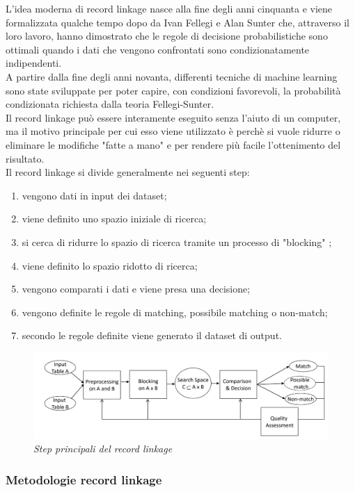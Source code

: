 \documentclass[a4paper,12pt]{article}
\begin{document}
\noindent L'idea moderna di record linkage nasce alla fine degli anni cinquanta e viene formalizzata qualche tempo dopo da Ivan Fellegi e Alan Sunter \cite{fellegi69} che, attraverso il loro lavoro, hanno dimostrato che le regole di decisione probabilistiche sono ottimali quando i dati che vengono confrontati sono condizionatamente indipendenti. \\
\noindent A partire dalla fine degli anni novanta, differenti tecniche di machine learning sono state sviluppate per poter capire, con condizioni favorevoli, la probabilità condizionata richiesta dalla teoria Fellegi-Sunter. \\
\noindent Il record linkage può essere interamente eseguito senza l'aiuto di un computer, ma il motivo principale per cui esso viene utilizzato è perchè si vuole ridurre o eliminare le modifiche "fatte a mano" e per rendere più facile l'ottenimento del risultato. \\
\newpage
\noindent Il record linkage si divide generalmente nei seguenti step:
\begin{enumerate}
\item vengono dati in input dei dataset;
\item viene definito uno spazio iniziale di ricerca;
\item si cerca di ridurre lo spazio di ricerca tramite un processo di "blocking" ;
\item viene definito lo spazio ridotto di ricerca;
\item vengono comparati i dati e viene presa una decisione;
\item vengono definite le regole di matching, possibile matching o non-match;
\item secondo le regole definite viene generato il dataset di output.
\end{enumerate}

\begin{figure}[H]
	\centering
	\includegraphics[width=0.8\linewidth]{img/recordlinkage.png}
	\caption{\textit{Step principali del record linkage}}
\end{figure}

\subsubsection{Metodologie record linkage}
\end{document}
